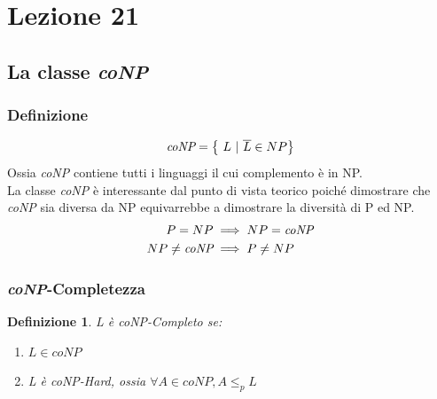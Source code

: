 \section{Lezione 21}

\subsection{La classe \emph{coNP}}

\subsubsection{Definizione}
\[
	\emph{coNP} = \left\{ \ L \ | \ \overline{L} \in NP \right\}
\]
Ossia \emph{coNP} contiene tutti i linguaggi il cui complemento è in NP. \\
La classe \emph{coNP} è interessante dal punto di vista teorico poiché dimostrare che \emph{coNP} sia diversa da NP equivarrebbe a dimostrare la diversità di P ed NP. \\

\begin{align*}
	P = NP &\implies NP = \emph{coNP} \\ 
	NP \neq \emph{coNP} &\implies P \neq NP
\end{align*} 

\subsubsection{\emph{coNP}-Completezza}
\newtheorem*{def1}{Definizione}
\begin{def1}
	L è \emph{coNP}-Completo se:
	\begin{enumerate}
		\item $L \in coNP$
		\item L è \emph{coNP-Hard}, ossia $\forall A \in coNP, A \leq_{p} L$
	\end{enumerate}
\end{def1}

